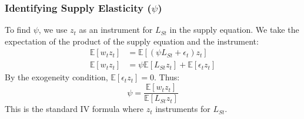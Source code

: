 \documentclass[aspectratio=169,11pt]{beamer}
\begin{document}
\begin{frame} \label{app_psi_identification}
    \frametitle{Identifying Supply Elasticity ($\psi$)}
    To find $\psi$, we use $z_t$ as an instrument for $L_{St}$ in the supply equation. We take the expectation of the product of the supply equation and the instrument:
    \begin{align*}
        \mathbb{E}[w_t z_t] & = \mathbb{E}[(\psi L_{St} + \epsilon_t) z_t]               \\
        \mathbb{E}[w_t z_t] & = \psi \mathbb{E}[L_{St} z_t] + \mathbb{E}[\epsilon_t z_t]
    \end{align*}
    By the exogeneity condition, $\mathbb{E}[\epsilon_t z_t] = 0$. Thus:
    \begin{equation}
        \psi = \frac{\mathbb{E}[w_t z_t]}{\mathbb{E}[L_{St} z_t]}
    \end{equation}
    This is the standard IV formula where $z_t$ instruments for $L_{St}$.
    \vspace{0.1cm}
    \hfill \hyperlink{src_psi_identification}{}
\end{frame}
\end{document}
